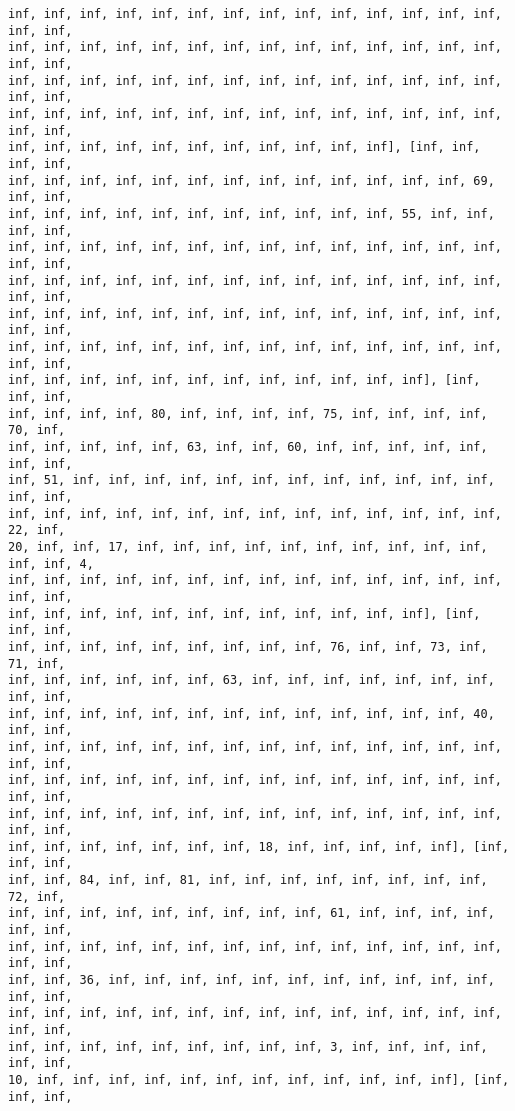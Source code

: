 \documentclass[11pt]{article}
\begin{document}
\begin{Verbatim}[commandchars=\\\{\}]
inf, inf, inf, inf, inf, inf, inf, inf, inf, inf, inf, inf, inf, inf, inf, inf,
inf, inf, inf, inf, inf, inf, inf, inf, inf, inf, inf, inf, inf, inf, inf, inf,
inf, inf, inf, inf, inf, inf, inf, inf, inf, inf, inf, inf, inf, inf, inf, inf,
inf, inf, inf, inf, inf, inf, inf, inf, inf, inf, inf, inf, inf, inf, inf, inf,
inf, inf, inf, inf, inf, inf, inf, inf, inf, inf, inf], [inf, inf, inf, inf,
inf, inf, inf, inf, inf, inf, inf, inf, inf, inf, inf, inf, inf, 69, inf, inf,
inf, inf, inf, inf, inf, inf, inf, inf, inf, inf, inf, 55, inf, inf, inf, inf,
inf, inf, inf, inf, inf, inf, inf, inf, inf, inf, inf, inf, inf, inf, inf, inf,
inf, inf, inf, inf, inf, inf, inf, inf, inf, inf, inf, inf, inf, inf, inf, inf,
inf, inf, inf, inf, inf, inf, inf, inf, inf, inf, inf, inf, inf, inf, inf, inf,
inf, inf, inf, inf, inf, inf, inf, inf, inf, inf, inf, inf, inf, inf, inf, inf,
inf, inf, inf, inf, inf, inf, inf, inf, inf, inf, inf, inf], [inf, inf, inf,
inf, inf, inf, inf, 80, inf, inf, inf, inf, 75, inf, inf, inf, inf, 70, inf,
inf, inf, inf, inf, inf, 63, inf, inf, 60, inf, inf, inf, inf, inf, inf, inf,
inf, 51, inf, inf, inf, inf, inf, inf, inf, inf, inf, inf, inf, inf, inf, inf,
inf, inf, inf, inf, inf, inf, inf, inf, inf, inf, inf, inf, inf, inf, 22, inf,
20, inf, inf, 17, inf, inf, inf, inf, inf, inf, inf, inf, inf, inf, inf, inf, 4,
inf, inf, inf, inf, inf, inf, inf, inf, inf, inf, inf, inf, inf, inf, inf, inf,
inf, inf, inf, inf, inf, inf, inf, inf, inf, inf, inf, inf], [inf, inf, inf,
inf, inf, inf, inf, inf, inf, inf, inf, inf, 76, inf, inf, 73, inf, 71, inf,
inf, inf, inf, inf, inf, inf, 63, inf, inf, inf, inf, inf, inf, inf, inf, inf,
inf, inf, inf, inf, inf, inf, inf, inf, inf, inf, inf, inf, inf, 40, inf, inf,
inf, inf, inf, inf, inf, inf, inf, inf, inf, inf, inf, inf, inf, inf, inf, inf,
inf, inf, inf, inf, inf, inf, inf, inf, inf, inf, inf, inf, inf, inf, inf, inf,
inf, inf, inf, inf, inf, inf, inf, inf, inf, inf, inf, inf, inf, inf, inf, inf,
inf, inf, inf, inf, inf, inf, inf, 18, inf, inf, inf, inf, inf], [inf, inf, inf,
inf, inf, 84, inf, inf, 81, inf, inf, inf, inf, inf, inf, inf, inf, 72, inf,
inf, inf, inf, inf, inf, inf, inf, inf, inf, 61, inf, inf, inf, inf, inf, inf,
inf, inf, inf, inf, inf, inf, inf, inf, inf, inf, inf, inf, inf, inf, inf, inf,
inf, inf, 36, inf, inf, inf, inf, inf, inf, inf, inf, inf, inf, inf, inf, inf,
inf, inf, inf, inf, inf, inf, inf, inf, inf, inf, inf, inf, inf, inf, inf, inf,
inf, inf, inf, inf, inf, inf, inf, inf, inf, 3, inf, inf, inf, inf, inf, inf,
10, inf, inf, inf, inf, inf, inf, inf, inf, inf, inf, inf, inf], [inf, inf, inf,

\end{Verbatim}
\end{document}
